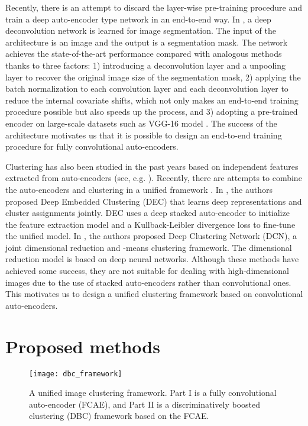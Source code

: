 \documentclass[preprint,12pt]{elsarticle}
\begin{document}
Recently, there is an attempt to discard the layer-wise pre-training procedure and train a deep auto-encoder type
network in an end-to-end way. In \cite{Noh2015deconvolution}, a deep deconvolution network is learned for image
segmentation. The input of the architecture is an image and the output is a segmentation mask. The network achieves
the state-of-the-art performance compared with analogous methods thanks to three factors: 1) introducing a
deconvolution layer and a unpooling layer \cite{Zeiler2014visualizing,Mohan2014deconvolution,Zeiler2011deconvolution}
to recover the original image size of the segmentation mask, 2) applying the batch normalization \cite{Ioffe2015BN}
to each convolution layer and each deconvolution layer to reduce the internal covariate shifts, which not only makes
an end-to-end training procedure possible but also speeds up the process, and 3) adopting a pre-trained encoder on
large-scale datasets such as VGG-16 model \cite{Simonyan2015VGG}. The success of the architecture motivates us
that it is possible to design an end-to-end training procedure for fully convolutional auto-encoders.

Clustering has also been studied in the past years based on independent features extracted from auto-encoders
(see, e.g. \cite{Ding2007AdaptiveDR,Tian2014graph,Huang2014DEN,Song2013AEC}). Recently, there are attempts to
combine the auto-encoders and clustering in a unified framework \cite{Xie2015DEC,Yang2016DCN}. In \cite{Xie2015DEC},
the authors proposed Deep Embedded Clustering (DEC) that learns deep representations and cluster assignments jointly.
DEC uses a deep stacked auto-encoder to initialize the feature extraction model and a Kullback-Leibler divergence
loss to fine-tune the unified model. In \cite{Yang2016DCN}, the authors proposed Deep Clustering Network (DCN),
a joint dimensional reduction and -means clustering framework. The dimensional reduction model is based on
deep neural networks. Although these methods have achieved some success, they are not suitable for dealing with
high-dimensional images due to the use of stacked auto-encoders rather than convolutional ones.
This motivates us to design a unified clustering framework based on convolutional auto-encoders.

\section{Proposed methods}
\label{sec:FCAE-DBC}


\begin{figure}[!t]
\centering
\texttt{[image: dbc\_framework]}
\caption{A unified image clustering framework. Part I is a fully convolutional auto-encoder (FCAE), and
Part II is a discriminatively boosted clustering (DBC) framework based on the FCAE.}
\label{fig:dbc}
\end{figure}
\end{document}

